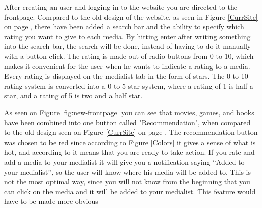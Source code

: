 After creating an user and logging in to the website you are directed to the frontpage. Compared to the old design of the website, as seen in Figure \ref{CurrSite} on page \pageref{CurrSite}, there have been added a search bar and the ability to specify which rating you want to give to each media. By hitting enter after writing something into the search bar, the search will be done, instead of having to do it manually with a button click. The rating is made out of radio buttons from 0 to 10, which makes it convenient for the user when he wants to indicate a rating to a media. Every rating is displayed on the medialist tab in the form of stars. The 0 to 10 rating system is converted into a 0 to 5 star system, where a rating of 1 is half a star, and a rating of 5 is two and a half star.

As seen on Figure \ref{fig:new-frontpage} you can see that movies, games, and books have been combined into one button called "Recommendation", when compared to the old design seen on Figure \ref{CurrSite} on page \pageref{CurrSite}. The recommendation button was chosen to be red since according to Figure \ref{Colors} it gives a sense of what is hot, and according to \cite{EmpowerColor} it means that you are ready to take action. If you rate and add a media to your medialist it will give you a notification saying “Added to your medialist”, so the user will know where his media will be added to. This is not the most optimal way, since you will not know from the beginning that you can click on the media and it will be added to your medialist. This feature would have to be made more obvious

